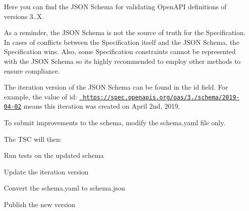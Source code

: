 Here you can find the JSON Schema for validating Open\+API definitions of versions 3..\+X.

As a reminder, the JSON Schema is not the source of truth for the Specification. In cases of conflicts between the Specification itself and the JSON Schema, the Specification wins. Also, some Specification constraints cannot be represented with the JSON Schema so it\textquotesingle{}s highly recommended to employ other methods to ensure compliance.

The iteration version of the JSON Schema can be found in the {\ttfamily id} field. For example, the value of {\ttfamily id\+: \href{https://spec.openapis.org/oas/3.0/schema/2019-04-02}{\texttt{ https\+://spec.\+openapis.\+org/oas/3./schema/2019-\/04-\/02}}} means this iteration was created on April 2nd, 2019.

To submit improvements to the schema, modify the schema.\+yaml file only.

The TSC will then\+:
\begin{DoxyItemize}
\item Run tests on the updated schema
\item Update the iteration version
\item Convert the schema.\+yaml to schema.\+json
\item Publish the new version 
\end{DoxyItemize}